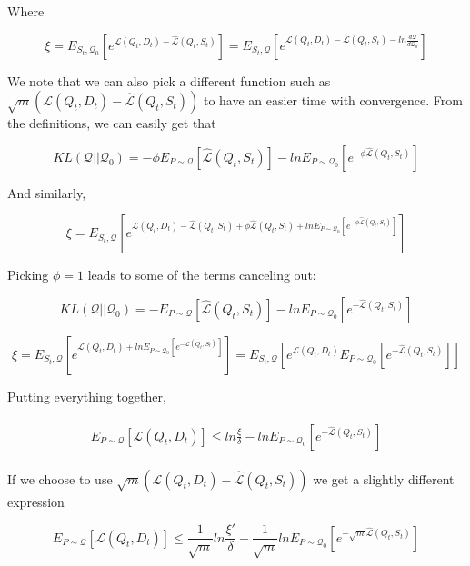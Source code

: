 \documentclass[letterpaper]{article}
\theoremstyle{definition}
\begin{document}
Where 

$$ \xi = E_{S_t, \mathcal{Q}_0}\left [e^{\mathcal{L}(Q_t, D_t) - \hat{\mathcal{L}}(Q_t, S_t)} \right ] =  E_{S_t, \mathcal{Q}}\left [e^{\mathcal{L}(Q_t, D_t) - \hat{\mathcal{L}}(Q_t, S_t)-ln\frac{d\mathcal{Q}}{d\mathcal{Q}_0}} \right ]$$

We note that we can also pick a different function such as $\sqrt{m}\left (\mathcal{L}(Q_t, D_t) - \hat{\mathcal{L}}(Q_t, S_t) \right )$ to have an easier time with convergence.
From the definitions, we can easily get that

$$ KL(\mathcal{Q}||\mathcal{Q}_0) = -\phi E_{P\sim \mathcal{Q}}\left [ \hat{\mathcal{L}}(Q_t, S_t)  \right ] -ln E_{P\sim \mathcal{Q}_0} \left [e^{-\phi \hat{\mathcal{L}}(Q_t, S_t)}\right ]$$

And similarly,

$$\xi = E_{S_t, \mathcal{Q}}\left [e^{\mathcal{L}(Q_t, D_t) - \hat{\mathcal{L}}(Q_t, S_t)+\phi \hat{\mathcal{L}}(Q_t, S_t)  +lnE_{P\sim \mathcal{Q}_0} \left [e^{-\phi \hat{\mathcal{L}}(Q_t, S_t)}\right ]} \right ]$$

Picking $\phi=1$ leads to some of the terms canceling out:

$$ KL(\mathcal{Q}||\mathcal{Q}_0) = -E_{P\sim \mathcal{Q}}\left [ \hat{\mathcal{L}}(Q_t, S_t)  \right ] -ln E_{P\sim \mathcal{Q}_0} \left [e^{-\hat{\mathcal{L}}(Q_t, S_t)}\right ]$$

$$\xi = E_{S_t, \mathcal{Q}}\left [e^{\mathcal{L}(Q_t, D_t) +lnE_{P\sim \mathcal{Q}_0} \left [e^{-\hat{\mathcal{L}}(Q_t, S_t)}\right ]} \right ]=E_{S_t, \mathcal{Q}}\left [e^{\mathcal{L}(Q_t, D_t)}  E_{P\sim \mathcal{Q}_0} \left [e^{-\hat{\mathcal{L}}(Q_t, S_t)}\right ] \right ]$$

Putting everything together,


\begin{align} 
\begin{split}
E_{P\sim \mathcal{Q}} \left [\mathcal{L}(Q_t, D_t)\right ] \leq  ln\frac{\xi}{\delta} -ln E_{P\sim \mathcal{Q}_0} \left [e^{-\hat{\mathcal{L}}(Q_t, S_t)}\right ]
\end{split}
\end{align}


If we choose to use $\sqrt{m}\left (\mathcal{L}(Q_t, D_t) - \hat{\mathcal{L}}(Q_t, S_t) \right )$ we get a slightly different expression

$$ E_{P\sim \mathcal{Q}} \left [\mathcal{L}(Q_t, D_t)\right ] \leq  \frac{1}{\sqrt{m}}ln\frac{\xi'}{\delta} -\frac{1}{\sqrt{m}}ln E_{P\sim \mathcal{Q}_0} \left [e^{-\sqrt{m}\hat{\mathcal{L}}(Q_t, S_t)}\right ] $$
\end{document}
